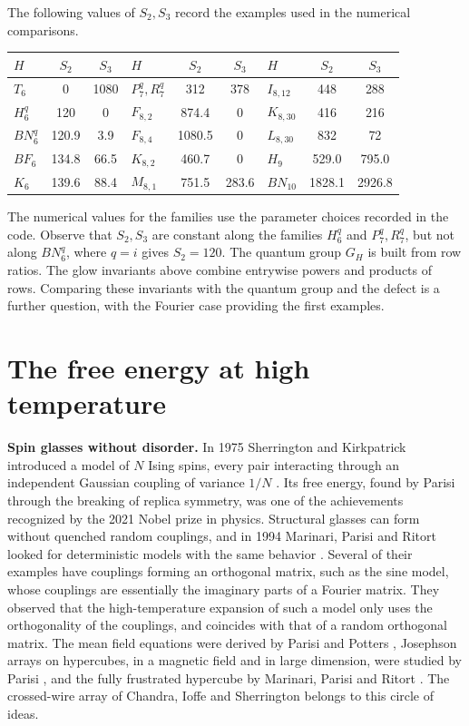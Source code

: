 \documentclass[11pt,a4paper]{article}
\theoremstyle{remark}
\begin{document}
The following values of $S_2,S_3$ record the examples used in the numerical comparisons.

\medskip

\begin{center}
\begin{tabular}{lcc|lcc|lcc}
\toprule
$H$ & $S_2$ & $S_3$ & $H$ & $S_2$ & $S_3$ & $H$ & $S_2$ & $S_3$\\
\midrule
$T_6$ & 0 & 1080 & $P_7^q,R_7^q$ & 312 & 378 & $I_{8,12}$ & 448 & 288\\
$H_6^q$ & 120 & 0 & $F_{8,2}$ & 874.4 & 0 & $K_{8,30}$ & 416 & 216\\
$BN_6^q$ & 120.9 & 3.9 & $F_{8,4}$ & 1080.5 & 0 & $L_{8,30}$ & 832 & 72\\
$BF_6$ & 134.8 & 66.5 & $K_{8,2}$ & 460.7 & 0 & $H_9$ & 529.0 & 795.0\\
$K_6$ & 139.6 & 88.4 & $M_{8,1}$ & 751.5 & 283.6 & $BN_{10}$ & 1828.1 & 2926.8\\
\bottomrule
\end{tabular}
\end{center}

\medskip

\noindent The numerical values for the families use the parameter choices recorded in the code. Observe that $S_2,S_3$ are constant along the families $H_6^q$ and $P_7^q,R_7^q$, but not along $BN_6^q$, where $q=i$ gives $S_2=120$. The quantum group $G_H$ is built from row ratios. The glow invariants above combine entrywise powers and products of rows. Comparing these invariants with the quantum group and the defect is a further question, with the Fourier case providing the first examples.

\section{The free energy at high temperature}\label{sec:free}

\medskip
\noindent\textbf{Spin glasses without disorder.}
In 1975 Sherrington and Kirkpatrick introduced a model of $N$ Ising spins, every pair interacting through an independent Gaussian coupling of variance $1/N$ \cite{ski}. Its free energy, found by Parisi through the breaking of replica symmetry, was one of the achievements recognized by the 2021 Nobel prize in physics. Structural glasses can form without quenched random couplings, and in 1994 Marinari, Parisi and Ritort looked for deterministic models with the same behavior \cite{mp1,mp2}. Several of their examples have couplings forming an orthogonal matrix, such as the sine model, whose couplings are essentially the imaginary parts of a Fourier matrix. They observed that the high-temperature expansion of such a model only uses the orthogonality of the couplings, and coincides with that of a random orthogonal matrix. The mean field equations were derived by Parisi and Potters \cite{ppo}, Josephson arrays on hypercubes, in a magnetic field and in large dimension, were studied by Parisi \cite{par}, and the fully frustrated hypercube by Marinari, Parisi and Ritort \cite{mp3}. The crossed-wire array of Chandra, Ioffe and Sherrington \cite{cis} belongs to this circle of ideas.
\end{document}
